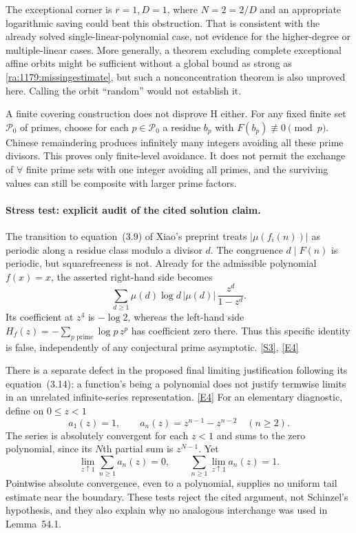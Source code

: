 \documentclass[11pt]{article}
\newcommand{\sref}[2]{\hyperlink{source:#1:#2}{[S#2]}}
\newcommand{\eref}[2]{\hyperlink{extra:#1:#2}{[E#2]}}
\begin{document}
The exceptional corner is $r=1,D=1$, where $N=2=2/D$ and an appropriate
logarithmic saving could beat this obstruction. That is consistent with
the already solved single-linear-polynomial case, not evidence for the
higher-degree or multiple-linear cases. More generally, a theorem
excluding complete exceptional affine orbits might be sufficient without
a global bound as strong as \eqref{ra:1179:missingestimate}, but such a
nonconcentration theorem is also unproved here. Calling the orbit
``random'' would not establish it.

A finite covering construction does not disprove H either. For any fixed
finite set $\mathcal P_0$ of primes, choose for each $p\in\mathcal P_0$
a residue $b_p$ with $F(b_p)\not\equiv0\pmod p$. Chinese remaindering
produces infinitely many integers avoiding all these prime divisors.
This proves only finite-level avoidance. It does not permit the exchange
of $\forall$ finite prime sets with one integer avoiding all primes, and
the surviving values can still be composite with larger prime factors.

\paragraph{Stress test: explicit audit of the cited solution claim.}
The transition to equation~(3.9) of Xiao's preprint treats
$|\mu(f_i(n))|$ as periodic along a residue class modulo a divisor $d$.
The congruence $d\mid F(n)$ is periodic, but squarefreeness is not.
Already for the admissible polynomial $f(x)=x$, the asserted right-hand
side becomes
\[
 \sum_{d\ge1}\mu(d)\log d\,|\mu(d)|\,
       \frac{z^d}{1-z^d}.
\]
Its coefficient at $z^4$ is $-\log2$, whereas the left-hand side
$H_f(z)=-\sum_{p\text{ prime}}\log p\,z^p$ has coefficient zero there.
Thus this specific identity is false, independently of any conjectural
prime asymptotic. \sref{1179}{3}, \eref{1179}{4}

There is a separate defect in the proposed final limiting justification
following its equation~(3.14): a function's being a polynomial does not
justify termwise limits in an unrelated infinite-series representation.
\eref{1179}{4}
For an elementary diagnostic, define on $0\le z<1$
\[
 a_1(z)=1,\qquad a_n(z)=z^{n-1}-z^{n-2}\quad(n\ge2).
\]
The series is absolutely convergent for each $z<1$ and sums to the zero
polynomial, since its $N$th partial sum is $z^{N-1}$. Yet
\[
 \lim_{z\uparrow1}\sum_{n\ge1}a_n(z)=0,
 \qquad
 \sum_{n\ge1}\lim_{z\uparrow1}a_n(z)=1.
\]
Pointwise absolute convergence, even to a polynomial, supplies no
uniform tail estimate near the boundary. These tests reject the cited
argument, not Schinzel's hypothesis, and they also explain why no
analogous interchange was used in Lemma~54.1.
\end{document}
